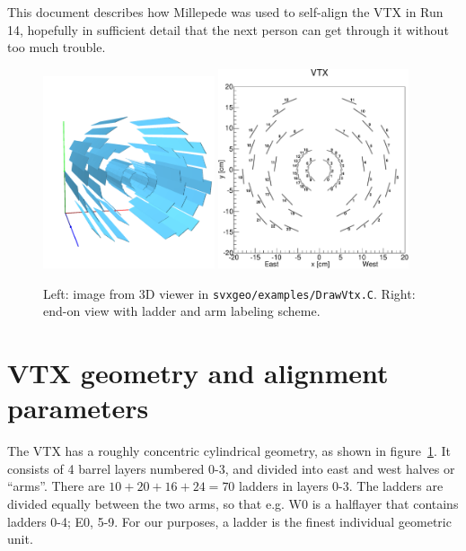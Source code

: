 \documentclass[12pt]{article}
\begin{document}
This document describes how Millepede was used to self-align the VTX in Run 14, hopefully in sufficient detail that the next person can get through it without too much trouble.

\begin{figure}[tb]
  \begin{center}
    \includegraphics[width=0.45\textwidth]{viewer}
    \quad
    \includegraphics[width=0.5\textwidth]{vtx-xy}
  \end{center}
  \caption{Left: image from 3D viewer in \texttt{svxgeo/examples/DrawVtx.C}. Right: end-on view with ladder and arm labeling scheme.}
  \label{fig:vtx}
\end{figure}

\section{VTX geometry and alignment parameters}
The VTX has a roughly concentric cylindrical geometry, as shown in figure~\ref{fig:vtx}. It consists of 4 barrel layers numbered 0-3, and divided into east and west halves or ``arms''. There are $10+20+16+24 = 70$ ladders in layers 0-3. The ladders are divided equally between the two arms, so that e.g. W0 is a halflayer that contains ladders 0-4; E0, 5-9. For our purposes, a ladder is the finest individual geometric unit.
\end{document}
